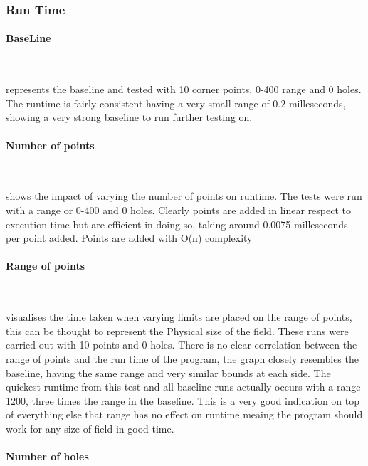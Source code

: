 \documentclass[final]{cmpreport_02}
\begin{document}
\subsubsection{Run Time}
\paragraph{BaseLine} \

 represents the baseline and tested with 10 corner points, 0-400 range and 0 holes.
The runtime is fairly consistent having a very small range of 0.2 milleseconds, showing a very strong baseline to run further testing on.


\paragraph{Number of points} \

 shows the impact of varying the number of points on runtime.
The tests were run with a range or 0-400 and 0 holes.
Clearly points are added in linear respect to execution time but are efficient in doing so, taking around 0.0075 milleseconds per point added.
Points are added with O(n) complexity


\paragraph{Range of points} \

 visualises the time taken when varying limits are placed on the range of points, this can be thought to represent the Physical size of the field.
These runs were carried out with 10 points and 0 holes.
There is no clear correlation between the range of points and the run time of the program, the graph closely resembles the baseline, having the same range and very similar bounds at each side.
The quickest runtime from this test and all baseline runs actually occurs with a range 1200, three times the range in the baseline.
This is a very good indication on top of everything else that range has no effect on runtime meaing the program should work for any size of field in good time.

\paragraph{Number of holes} \
\end{document}
